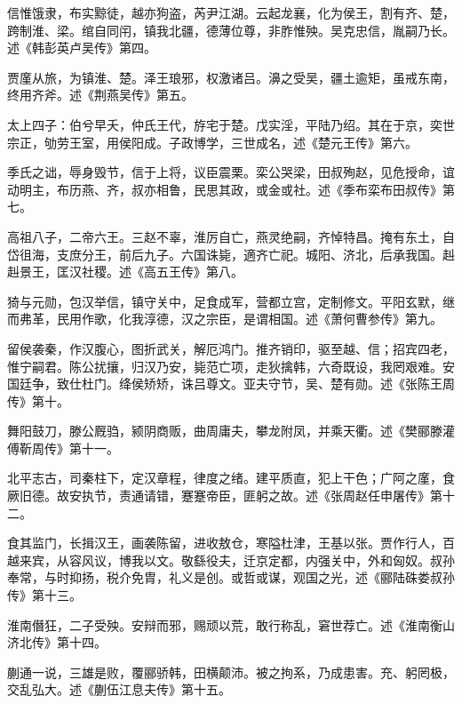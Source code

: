 \documentclass[12pt,UTF8]{ctexbook}
\begin{document}
信惟饿隶，布实黥徒，越亦狗盗，芮尹江湖。云起龙襄，化为侯王，割有齐、楚，跨制淮、梁。绾自同闬，镇我北疆，德薄位尊，非胙惟殃。吴克忠信，胤嗣乃长。述《韩彭英卢吴传》第四。



贾廑从旅，为镇淮、楚。泽王琅邪，权激诸吕。濞之受吴，疆土逾矩，虽戒东南，终用齐斧。述《荆燕吴传》第五。



太上四子：伯兮早夭，仲氏王代，斿宅于楚。戊实淫，平陆乃绍。其在于京，奕世宗正，劬劳王室，用侯阳成。子政博学，三世成名，述《楚元王传》第六。



季氏之诎，辱身毁节，信于上将，议臣震栗。栾公哭梁，田叔殉赵，见危授命，谊动明主，布历燕、齐，叔亦相鲁，民思其政，或金或社。述《季布栾布田叔传》第七。



高祖八子，二帝六王。三赵不辜，淮厉自亡，燕灵绝嗣，齐悼特昌。掩有东土，自岱徂海，支庶分王，前后九子。六国诛毙，適齐亡祀。城阳、济北，后承我国。赳赳景王，匡汉社稷。述《高五王传》第八。



猗与元勋，包汉举信，镇守关中，足食成军，营都立宫，定制修文。平阳玄默，继而弗革，民用作歌，化我淳德，汉之宗臣，是谓相国。述《萧何曹参传》第九。



留侯袭秦，作汉腹心，图折武关，解厄鸿门。推齐销印，驱至越、信；招宾四老，惟宁嗣君。陈公扰攘，归汉乃安，毙范亡项，走狄擒韩，六奇既设，我罔艰难。安国廷争，致仕杜门。绛侯矫矫，诛吕尊文。亚夫守节，吴、楚有勋。述《张陈王周传》第十。



舞阳鼓刀，滕公厩驺，颍阴商贩，曲周庸夫，攀龙附凤，并乘天衢。述《樊郦滕灌傅靳周传》第十一。



北平志古，司秦柱下，定汉章程，律度之绪。建平质直，犯上干色；广阿之廑，食厥旧德。故安执节，责通请错，蹇蹇帝臣，匪躬之故。述《张周赵任申屠传》第十二。



食其监门，长揖汉王，画袭陈留，进收敖仓，寒隘杜津，王基以张。贾作行人，百越来宾，从容风议，博我以文。敬繇役夫，迁京定都，内强关中，外和匈奴。叔孙奉常，与时抑扬，税介免胄，礼义是创。或哲或谋，观国之光，述《郦陆硃娄叔孙传》第十三。



淮南僭狂，二子受殃。安辩而邪，赐顽以荒，敢行称乱，窘世荐亡。述《淮南衡山济北传》第十四。



蒯通一说，三雄是败，覆郦骄韩，田横颠沛。被之拘系，乃成患害。充、躬罔极，交乱弘大。述《蒯伍江息夫传》第十五。
\end{document}
